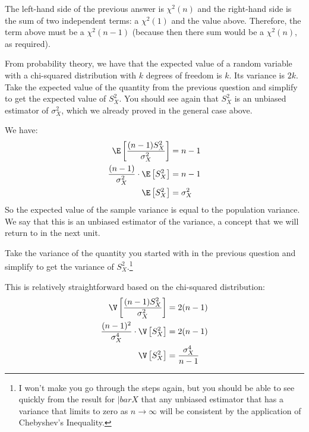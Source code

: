 
The left-hand side of the previous answer is $\chi^2(n)$ and the right-hand
side is the sum of two independent terms: a $\chi^2(1)$ and the value above. Therefore,
the term above must be a $\chi^2(n-1)$ (because then there sum would be a $\chi^2(n)$,
as required). 


From probability theory, we have that the expected value of a random variable with
a chi-squared distribution with $k$ degrees of freedom is $k$. Its variance is $2k$.
Take the expected value of the quantity from the previous question and
simplify to get the expected value of $S_X^2$. You should see again that $S_X^2$ is
an unbiased estimator of $\sigma_X^2$, which we already proved in the general case
above.


We have:
\begin{align*}
\E \left[ \frac{(n-1) S_X^2}{\sigma_X^2} \right] &= n-1 \\
\frac{(n-1)}{\sigma_X^2} \cdot \E \left[ S_X^2 \right] &= n-1 \\
\E \left[ S_X^2 \right] &= \sigma_X^2
\end{align*}
So the expected value of the sample variance is equal to the population variance.
We say that this is an unbiased estimator of the variance, a concept that we will
return to in the next unit.


Take the variance of the quantity you started with in the previous question and
simplify to get the variance of $S_X^2$.\footnote{
  I won't make you go through the steps again, but you should be able to see
  quickly from the result for $|bar{X}$ that any unbiased estimator that has
  a variance that limits to zero as $n\rightarrow\infty$ will be consistent
  by the application of Chebyshev's Inequality.
}


This is relatively straightforward based on the chi-squared distribution:
\begin{align*}
\V \left[ \frac{(n-1) S_X^2}{\sigma_X^2} \right] &= 2(n-1) \\
\frac{(n-1)^2}{\sigma_X^4} \cdot \V \left[ S_X^2 \right] &= 2(n-1) \\
\V \left[ S_X^2 \right] &= \frac{\sigma_X^4}{n-1}
\end{align*}

